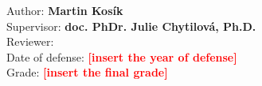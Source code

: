 \pagestyle{empty}

\vfill

\vglue 16cm

\noindent \large{Author: \textbf{Martin Kosík }}\\
\noindent \large{Supervisor: \textbf{doc. PhDr. Julie Chytilová, Ph.D.}}\\
\noindent \large{Reviewer: \textbf{}}\\
\noindent \large{Date of defense:}
\normalsize{\textbf{\textcolor{red}{[insert the year of defense]}}}\\
\newline
\noindent \large{Grade:} \normalsize{\textbf{\textcolor{red}{[insert the final grade]}}}\\

